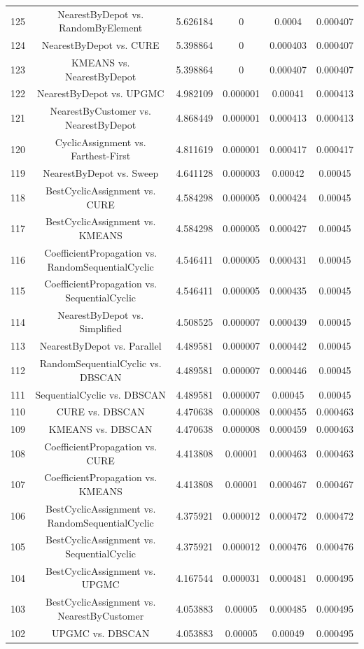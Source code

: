 \documentclass[a4paper,10pt]{article}
\begin{document}
\begin{landscape}
\begin{table}[!htp]
\begin{tabular}{cccccc}
125&NearestByDepot vs. RandomByElement&5.626184&0&0.0004&0.000407\\
124&NearestByDepot vs. CURE&5.398864&0&0.000403&0.000407\\
123&KMEANS vs. NearestByDepot&5.398864&0&0.000407&0.000407\\
122&NearestByDepot vs. UPGMC&4.982109&0.000001&0.00041&0.000413\\
121&NearestByCustomer vs. NearestByDepot&4.868449&0.000001&0.000413&0.000413\\
120&CyclicAssignment vs. Farthest-First&4.811619&0.000001&0.000417&0.000417\\
119&NearestByDepot vs. Sweep&4.641128&0.000003&0.00042&0.00045\\
118&BestCyclicAssignment vs. CURE&4.584298&0.000005&0.000424&0.00045\\
117&BestCyclicAssignment vs. KMEANS&4.584298&0.000005&0.000427&0.00045\\
116&CoefficientPropagation vs. RandomSequentialCyclic&4.546411&0.000005&0.000431&0.00045\\
115&CoefficientPropagation vs. SequentialCyclic&4.546411&0.000005&0.000435&0.00045\\
114&NearestByDepot vs. Simplified&4.508525&0.000007&0.000439&0.00045\\
113&NearestByDepot vs. Parallel&4.489581&0.000007&0.000442&0.00045\\
112&RandomSequentialCyclic vs. DBSCAN&4.489581&0.000007&0.000446&0.00045\\
111&SequentialCyclic vs. DBSCAN&4.489581&0.000007&0.00045&0.00045\\
110&CURE vs. DBSCAN&4.470638&0.000008&0.000455&0.000463\\
109&KMEANS vs. DBSCAN&4.470638&0.000008&0.000459&0.000463\\
108&CoefficientPropagation vs. CURE&4.413808&0.00001&0.000463&0.000463\\
107&CoefficientPropagation vs. KMEANS&4.413808&0.00001&0.000467&0.000467\\
106&BestCyclicAssignment vs. RandomSequentialCyclic&4.375921&0.000012&0.000472&0.000472\\
105&BestCyclicAssignment vs. SequentialCyclic&4.375921&0.000012&0.000476&0.000476\\
104&BestCyclicAssignment vs. UPGMC&4.167544&0.000031&0.000481&0.000495\\
103&BestCyclicAssignment vs. NearestByCustomer&4.053883&0.00005&0.000485&0.000495\\
102&UPGMC vs. DBSCAN&4.053883&0.00005&0.00049&0.000495\\

\end{tabular}
\end{table}
\end{landscape}
\end{document}
